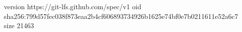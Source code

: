 version https://git-lfs.github.com/spec/v1
oid sha256:799d57fec038f873eaa2b4cf606893734926b1625e74bf0e7b0211611e52a6c7
size 21463
